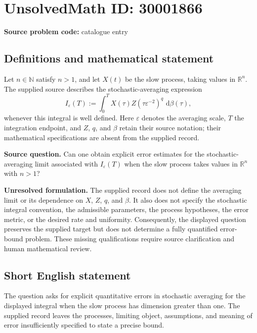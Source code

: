 \documentclass[11pt]{article}
\newcommand{\N}{\mathbb{N}}
\newcommand{\R}{\mathbb{R}}
\newcommand{\dd}{\,\mathrm{d}}
\begin{document}
\section*{UnsolvedMath ID: 30001866}
\textbf{Source problem code:} catalogue entry
\subsection{Definitions and mathematical statement}
Let \(n\in\N\) satisfy \(n>1\), and let \(X(t)\) be the slow process, taking values in \(\R^n\). The supplied source describes the stochastic-averaging expression
\[
I_{\varepsilon}(T):=\int_0^T X(\tau)Z(\tau\varepsilon^{-2})^q\,\dd\beta(\tau),
\]
whenever this integral is well defined. Here \(\varepsilon\) denotes the averaging scale, \(T\) the integration endpoint, and \(Z\), \(q\), and \(\beta\) retain their source notation; their mathematical specifications are absent from the supplied record.

\textbf{Source question.} Can one obtain explicit error estimates for the stochastic-averaging limit associated with \(I_{\varepsilon}(T)\) when the slow process takes values in \(\R^n\) with \(n>1\)?

\textbf{Unresolved formulation.} The supplied record does not define the averaging limit or its dependence on \(X\), \(Z\), \(q\), and \(\beta\). It also does not specify the stochastic integral convention, the admissible parameters, the process hypotheses, the error metric, or the desired rate and uniformity. Consequently, the displayed question preserves the supplied target but does not determine a fully quantified error-bound problem. These missing qualifications require source clarification and human mathematical review.
\subsection{Short English statement}
The question asks for explicit quantitative errors in stochastic averaging for the displayed integral when the slow process has dimension greater than one. The supplied record leaves the processes, limiting object, assumptions, and meaning of error insufficiently specified to state a precise bound.
\end{document}
